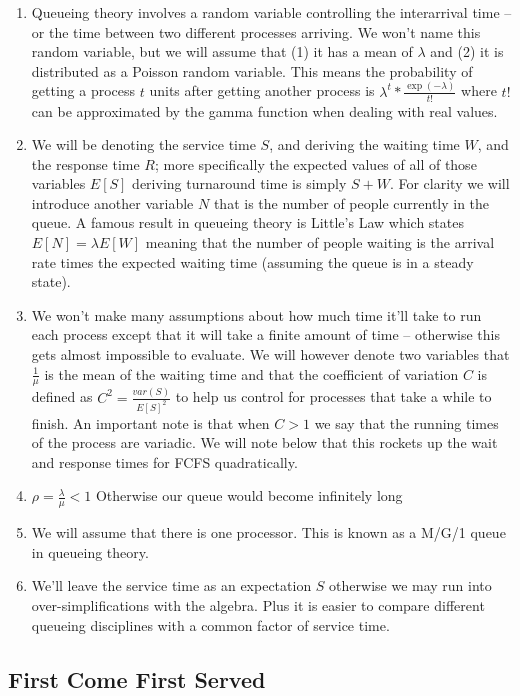 \begin{enumerate}
\item Queueing theory involves a random variable controlling the interarrival time -- or the time between two different processes arriving.
  We won't name this random variable, but we will assume that (1) it has a mean of $\lambda$ and (2) it is distributed as a Poisson random variable.
  This means the probability of getting a process $t$ units after getting another process is $\lambda^t * \frac{\exp(-\lambda)}{t!}$ where $t!$ can be approximated by the gamma function when dealing with real values.
\item We will be denoting the service time $S$, and deriving the waiting time $W$, and the response time $R$; more specifically the expected values of all of those variables $E[S]$ deriving turnaround time is simply $S + W$.
  For clarity we will introduce another variable $N$ that is the number of people currently in the queue.
  A famous result in queueing theory is Little's Law which states $E[N] = \lambda E[W]$ meaning that the number of people waiting is the arrival rate times the expected waiting time (assuming the queue is in a steady state).
\item We won't make many assumptions about how much time it'll take to run each process except that it will take a finite amount of time -- otherwise this gets almost impossible to evaluate.
We will however denote two variables that $\frac{1}{\mu}$ is the mean of the waiting time and that the coefficient of variation $C$ is defined as $C^2 = \frac{var(S)}{E[S]^2}$ to help us control for processes that take a while to finish.
An important note is that when $C > 1$ we say that the running times of the process are variadic. We will note below that this rockets up the wait and response times for FCFS quadratically.
\item $\rho = \frac{\lambda}{\mu} < 1$ Otherwise our queue would become infinitely long
\item We will assume that there is one processor. This is known as a M/G/1 queue in queueing theory.
\item We'll leave the service time as an expectation $S$ otherwise we may run into over-simplifications with the algebra.
  Plus it is easier to compare different queueing disciplines with a common factor of service time.
\end{enumerate}

\subsection{First Come First Served}

